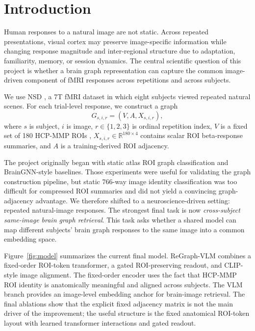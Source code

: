 \documentclass{article}
\begin{document}
\section{Introduction}

Human responses to a natural image are not static. Across repeated presentations, visual cortex may preserve image-specific information while changing response magnitude and inter-regional structure due to adaptation, familiarity, memory, or session dynamics. The central scientific question of this project is whether a brain graph representation can capture the common image-driven component of fMRI responses across repetitions and across subjects.

We use NSD \citep{allen2022nsd}, a 7T fMRI dataset in which eight subjects viewed repeated natural scenes. For each trial-level response, we construct a graph
\begin{equation}
  G_{s,i,r} = (V, A, X_{s,i,r}),
\end{equation}
where $s$ is subject, $i$ is image, $r \in \{1,2,3\}$ is ordinal repetition index, $V$ is a fixed set of 180 HCP-MMP ROIs \citep{glasser2016mmp}, $X_{s,i,r}\in\mathbb{R}^{180\times4}$ contains scalar ROI beta-response summaries, and $A$ is a training-derived ROI adjacency.

The project originally began with static atlas ROI graph classification and BrainGNN-style baselines. Those experiments were useful for validating the graph construction pipeline, but static 766-way image identity classification was too difficult for compressed ROI summaries and did not yield a convincing graph-adjacency advantage. We therefore shifted to a neuroscience-driven setting: repeated natural-image responses. The strongest final task is now \emph{cross-subject same-image brain graph retrieval}. This task asks whether a shared model can map different subjects' brain graph responses to the same image into a common embedding space.

Figure~\ref{fig:model} summarizes the current final model. ReGraph-VLM combines a fixed-order ROI-token transformer, a gated ROI-preserving readout, and CLIP-style image alignment. The fixed-order encoder uses the fact that HCP-MMP ROI identity is anatomically meaningful and aligned across subjects. The VLM branch provides an image-level embedding anchor for brain-image retrieval. The final ablations show that the explicit fixed adjacency matrix is not the main driver of the improvement; the useful structure is the fixed anatomical ROI-token layout with learned transformer interactions and gated readout.
\end{document}
